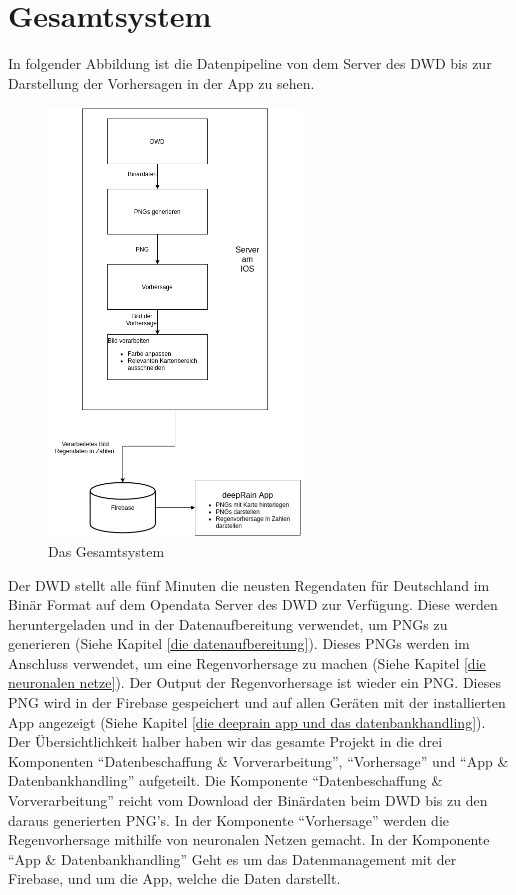 \section{Gesamtsystem}\label{gesamtsystem}
In folgender Abbildung ist die Datenpipeline von dem Server des DWD bis zur Darstellung der Vorhersagen in der App zu sehen.  

\begin{figure}[htb]
 \centering
 \includegraphics[width=0.6\textwidth,angle=0]{abb/Gesamtsystem}
 \caption[Das Gesamtsystem]{Das Gesamtsystem}
\label{fig:Beschreibung}
\end{figure}
\begin{sloppypar}
    \noindent
    Der DWD stellt alle fünf Minuten die neusten Regendaten für Deutschland im Binär Format auf dem Opendata Server des DWD zur Verfügung. 
    Diese werden heruntergeladen und in der Datenaufbereitung verwendet, um PNGs zu generieren (Siehe Kapitel \ref{die datenaufbereitung}). 
    Dieses PNGs werden im Anschluss verwendet, um eine Regenvorhersage zu machen (Siehe Kapitel \ref{die neuronalen netze}). 
    Der Output der Regenvorhersage ist wieder ein PNG. 
    Dieses PNG wird in der Firebase gespeichert und auf allen Geräten mit der installierten App angezeigt (Siehe Kapitel \ref{die deeprain app und das datenbankhandling}). 
    Der Übersichtlichkeit halber haben wir das gesamte Projekt in die drei Komponenten “Datenbeschaffung \& Vorverarbeitung”, “Vorhersage” und
    “App \& Datenbankhandling” aufgeteilt. 
    Die Komponente “Datenbeschaffung \& Vorverarbeitung” reicht vom Download der Binärdaten beim DWD bis zu den daraus generierten PNG’s. 
    In der Komponente “Vorhersage” werden die Regenvorhersage mithilfe von neuronalen Netzen gemacht. In der Komponente “App \& Datenbankhandling” 
    Geht es um das Datenmanagement mit der Firebase, und um die App, welche die Daten darstellt.
\end{sloppypar}